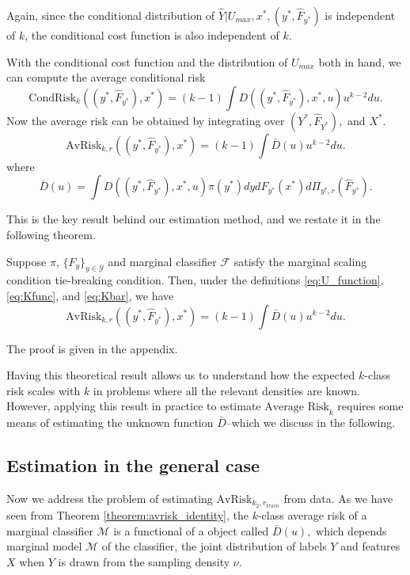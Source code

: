 \documentclass[12pt]{article}
\begin{document}
Again, since the conditional distribution of $\hat{Y}|U_{max}, x^*,
(y^*, \hat{F}_{y^*})$ is independent of $k$, the conditional cost
function is also independent of $k$.

With the conditional cost function and the distribution of $U_{max}$ both in hand, we can compute the average conditional risk
\[
\text{CondRisk}_k((y^*, \hat{F}_{y^*}), x^*) = (k-1) \int D((y^*,\hat{F}_{y^*}), x^*, u) u^{k-2} du.
\]
Now the average risk can be obtained by integrating over $(Y^*, \hat{F}_{Y^*}),$ and $X^*$.
\[
\text{AvRisk}_{k, r}((y^*, \hat{F}_{y^*}), x^*) = (k-1) \int \bar{D}(u) u^{k-2} du.
\]
where
\begin{equation}\label{eq:Kbar}
\bar{D}(u) = \int D((y^*,\hat{F}_{y^*}), x^*, u) \pi(y^*)dy dF_{y^*}(x^*) d\Pi_{y^*, r}(\hat{F}_{y^*}).
\end{equation}


This is the key result behind our estimation method, and we restate it
in the following theorem.

\begin{theorem}\label{theorem:avrisk_identity}
Suppose $\pi$, $\{F_y\}_{y \in \mathcal{Y}}$ and marginal classifier
$\mathcal{F}$ satisfy the marginal scaling condition tie-breaking
condition.  Then, under the
definitions \eqref{eq:U_function}, \eqref{eq:Kfunc},
and \eqref{eq:Kbar}, we have
\begin{equation}\label{eq:avrisk_identity}
\text{AvRisk}_{k, r}((y^*, \hat{F}_{y^*}), x^*) = (k-1) \int \bar{D}(u) u^{k-2} du.
\end{equation}
\end{theorem}

The proof is given in the appendix.

Having this theoretical result allows us to understand how the
expected $k$-class risk scales with $k$ in problems where all the
relevant densities are known.  However, applying this result in
practice to estimate $\text{Average Risk}_k$ requires some means of
estimating the unknown function $\bar{D}$--which we discuss in the
following.

\subsection{Estimation in the general case}\label{sec:estimation}

Now we address the problem of estimating $\text{AvRisk}_{k_2,
r_{train}}$ from data.  As we have seen from
Theorem \ref{theorem:avrisk_identity}, the $k$-class average risk of
a marginal classifier $\mathcal{M}$ is a functional of a object called
$\bar{D}(u),$ which depends marginal model $\mathcal{M}$ of the
classifier, the joint distribution of labels $Y$ and features $X$ when
$Y$ is drawn from the sampling density $\nu$.
\end{document}
